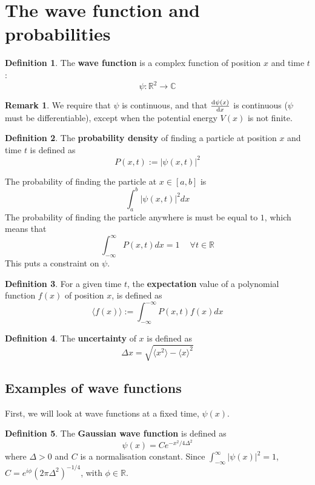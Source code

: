 \documentclass[12pt,a4paper]{article}
\theoremstyle{definition}
\newtheorem{definition}{Definition}[subsection]
\newtheorem*{remark}{Remark}
\let\oldforall\forall
\renewcommand{\forall}{\ \oldforall}
\begin{document}
\section{The wave function and probabilities}

\begin{definition}
	The \textbf{wave function} is a complex function of position $x$ and time $t$:
	\[
		\psi: \mathbb{R}^2 \rightarrow \mathbb{C}
	\]
\end{definition}

\begin{remark}
	We require that $\psi$ is continuous, and that $\diff{\psi(x)}{x}$ is continuous ($\psi$ must be differentiable), except when the potential energy $V(x)$ is not finite. 
\end{remark}

\begin{definition}
	The \textbf{probability density} of finding a particle at position $x$ and time $t$ is defined as
	\[
		P(x, t) := |\psi(x, t)|^2
	\]

	The probability of finding the particle at $x \in [a, b]$ is
	\[
		\int_a^b |\psi(x, t)|^2 dx
	\]
	The probability of finding the particle anywhere is must be equal to $1$, which means that
	\[
		\int_{-\infty}^{\infty} P(x, t) dx = 1 \quad \forall t \in \mathbb{R}
	\]
	This puts a constraint on $\psi$.
\end{definition}

\begin{definition}
	For a given time $t$, the \textbf{expectation} value of a polynomial function $f(x)$ of position $x$, is defined as
	\[
		\langle f(x) \rangle := \int_{-\infty}^{-\infty} P(x, t) f(x) dx
	\]
\end{definition}

\begin{definition}
	The \textbf{uncertainty} of $x$ is defined as
	\[
		\Delta x = \sqrt{\langle x^2 \rangle - \langle x \rangle ^2}
	\]
\end{definition}

\subsection{Examples of wave functions}

First, we will look at wave functions at a fixed time, $\psi(x)$.

\begin{definition}
	The \textbf{Gaussian wave function} is defined as
	\[
		\psi(x) = C e^{-x^2 / 4 \Delta^2}
	\]
	where $\Delta > 0$ and $C$ is a normalisation constant. Since $\int_{-\infty}^{\infty} |\psi(x)|^2 = 1$, $C = e^{i \phi} {(2 \pi \Delta^2)}^{-1/4}$, with $\phi \in \mathbb{R}$.
\end{definition}
\end{document}
